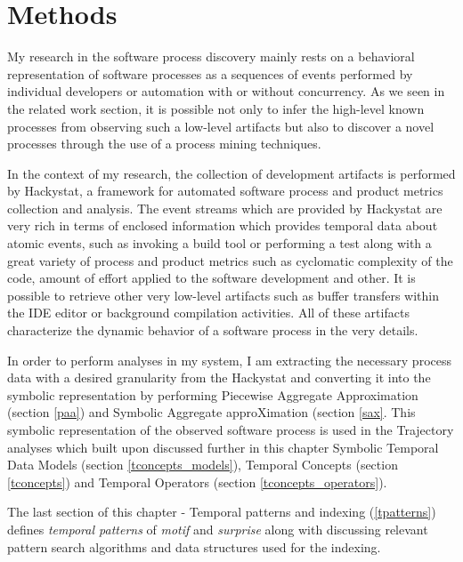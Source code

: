 \chapter{Methods} \label{methods}
My research in the software process discovery mainly rests on a behavioral representation of software processes as a sequences of events performed by individual developers or automation with or without concurrency. As we seen in the related work section, it is possible not only to infer the high-level known processes from observing such a low-level artifacts but also to discover a novel processes through the use of a process mining techniques.

In the context of my research, the collection of development artifacts is performed by Hackystat, a framework for automated software process and product metrics collection and analysis. The event streams which are provided by Hackystat are very rich in terms of enclosed information which provides temporal data about atomic events, such as invoking a build tool or performing a test along with a great variety of process and product metrics such as cyclomatic complexity of the code, amount of effort applied to the software development and other. It is possible to retrieve other very low-level artifacts such as buffer transfers within the IDE editor or background compilation activities. All of these artifacts characterize the dynamic behavior of a software process in the very details.

In order to perform analyses in my system, I am extracting the necessary process data with a desired granularity from the Hackystat and converting it into the symbolic representation by performing Piecewise Aggregate Approximation (section \ref{paa}) and Symbolic Aggregate approXimation (section \ref{sax}. This symbolic representation of the observed software process is used in the Trajectory analyses which built upon discussed further in this chapter Symbolic Temporal Data Models (section \ref{tconcepts_models}), Temporal Concepts (section \ref{tconcepts}) and Temporal Operators (section \ref{tconcepts_operators}).

The last section of this chapter - Temporal patterns and indexing (\ref{tpatterns}) defines \textit{temporal patterns} of \textit{motif} and \textit{surprise} along with discussing relevant pattern search algorithms and data structures used for the indexing.